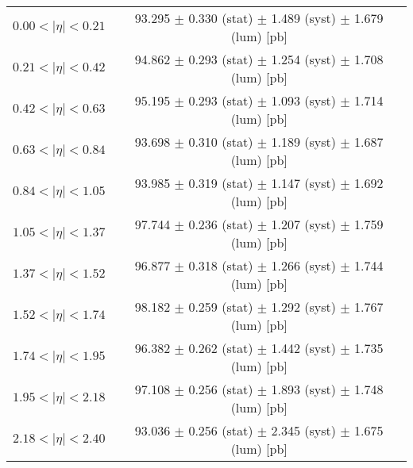 \begin{tabular}{lc}
\hline
$0.00 < |\eta| <0.21$          & 93.295 $\pm$ 0.330 (stat) $\pm$ 1.489 (syst) $\pm$ 1.679 (lum) [pb]  \\
$0.21 < |\eta| <0.42$          & 94.862 $\pm$ 0.293 (stat) $\pm$ 1.254 (syst) $\pm$ 1.708 (lum) [pb]  \\
$0.42 < |\eta| <0.63$          & 95.195 $\pm$ 0.293 (stat) $\pm$ 1.093 (syst) $\pm$ 1.714 (lum) [pb]  \\
$0.63 < |\eta| <0.84$          & 93.698 $\pm$ 0.310 (stat) $\pm$ 1.189 (syst) $\pm$ 1.687 (lum) [pb]  \\
$0.84 < |\eta| <1.05$          & 93.985 $\pm$ 0.319 (stat) $\pm$ 1.147 (syst) $\pm$ 1.692 (lum) [pb]  \\
$1.05 < |\eta| <1.37$          & 97.744 $\pm$ 0.236 (stat) $\pm$ 1.207 (syst) $\pm$ 1.759 (lum) [pb]  \\
$1.37 < |\eta| <1.52$          & 96.877 $\pm$ 0.318 (stat) $\pm$ 1.266 (syst) $\pm$ 1.744 (lum) [pb]  \\
$1.52 < |\eta| <1.74$          & 98.182 $\pm$ 0.259 (stat) $\pm$ 1.292 (syst) $\pm$ 1.767 (lum) [pb]  \\
$1.74 < |\eta| <1.95$          & 96.382 $\pm$ 0.262 (stat) $\pm$ 1.442 (syst) $\pm$ 1.735 (lum) [pb]  \\
$1.95 < |\eta| <2.18$          & 97.108 $\pm$ 0.256 (stat) $\pm$ 1.893 (syst) $\pm$ 1.748 (lum) [pb]  \\
$2.18 < |\eta| <2.40$          & 93.036 $\pm$ 0.256 (stat) $\pm$ 2.345 (syst) $\pm$ 1.675 (lum) [pb]  \\
\hline
\end{tabular}
